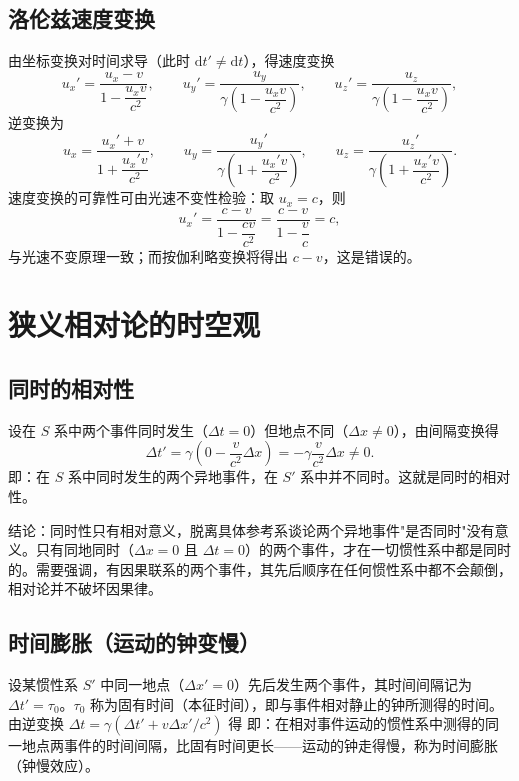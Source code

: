     \subsection{洛伦兹速度变换}
    由坐标变换对时间求导（此时 $\mathrm{d}t'\ne\mathrm{d}t$），得速度变换
    \[
    u_x'=\frac{u_x-v}{1-\dfrac{u_xv}{c^{2}}},\qquad
    u_y'=\frac{u_y}{\gamma\left(1-\dfrac{u_xv}{c^{2}}\right)},\qquad
    u_z'=\frac{u_z}{\gamma\left(1-\dfrac{u_xv}{c^{2}}\right)},
    \]
    逆变换为
    \[
    u_x=\frac{u_x'+v}{1+\dfrac{u_x'v}{c^{2}}},\qquad
    u_y=\frac{u_y'}{\gamma\left(1+\dfrac{u_x'v}{c^{2}}\right)},\qquad
    u_z=\frac{u_z'}{\gamma\left(1+\dfrac{u_x'v}{c^{2}}\right)}.
    \]
    速度变换的可靠性可由光速不变性检验：取 $u_x=c$，则
    \[
    u_x'=\frac{c-v}{1-\dfrac{cv}{c^{2}}}=\frac{c-v}{1-\dfrac{v}{c}}=c,
    \]
    与光速不变原理一致；而按伽利略变换将得出 $c-v$，这是错误的。


\section{狭义相对论的时空观}
    \subsection{同时的相对性}
    设在 $S$ 系中两个事件同时发生（$\Delta t=0$）但地点不同（$\Delta x\ne 0$），由间隔变换得
    \[
    \Delta t'=\gamma\left(0-\frac{v}{c^{2}}\Delta x\right)=-\gamma\frac{v}{c^{2}}\Delta x\ne 0.
    \]
    即：在 $S$ 系中同时发生的两个异地事件，在 $S'$ 系中并不同时。这就是同时的相对性。

    结论：同时性只有相对意义，脱离具体参考系谈论两个异地事件"是否同时"没有意义。只有同地同时（$\Delta x=0$ 且 $\Delta t=0$）的两个事件，才在一切惯性系中都是同时的。需要强调，有因果联系的两个事件，其先后顺序在任何惯性系中都不会颠倒，相对论并不破坏因果律。

    \subsection{时间膨胀（运动的钟变慢）}
    设某惯性系 $S'$ 中同一地点（$\Delta x'=0$）先后发生两个事件，其时间间隔记为 $\Delta t'=\tau_0$。$\tau_0$ 称为固有时间（本征时间），即与事件相对静止的钟所测得的时间。由逆变换 $\Delta t=\gamma(\Delta t'+v\Delta x'/c^{2})$ 得
    即：在相对事件运动的惯性系中测得的同一地点两事件的时间间隔，比固有时间更长——运动的钟走得慢，称为时间膨胀（钟慢效应）。

